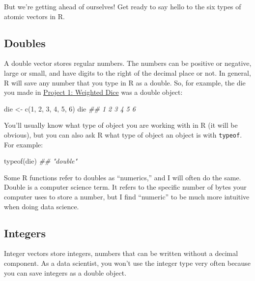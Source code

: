 \documentclass[
  letterpaper,
  DIV=11,
  numbers=noendperiod]{scrbook}
\newenvironment{Shaded}{\begin{snugshade}}{\end{snugshade}}
\newcommand{\DecValTok}[1]{\textcolor[rgb]{0.68,0.00,0.00}{#1}}
\newcommand{\DocumentationTok}[1]{\textcolor[rgb]{0.37,0.37,0.37}{\textit{#1}}}
\newcommand{\FunctionTok}[1]{\textcolor[rgb]{0.28,0.35,0.67}{#1}}
\newcommand{\NormalTok}[1]{\textcolor[rgb]{0.00,0.23,0.31}{#1}}
\newcommand{\OtherTok}[1]{\textcolor[rgb]{0.00,0.23,0.31}{#1}}
\begin{document}
But we're getting ahead of ourselves! Get ready to say hello to the six
types of atomic vectors in R.

\subsection{Doubles}\label{doubles}

A double vector stores regular numbers. The numbers can be positive or
negative, large or small, and have digits to the right of the decimal
place or not. In general, R will save any number that you type in R as a
double. So, for example, the die you made in
\hyperref[sec-project-dice]{Project 1: Weighted Dice} was a double
object:

\begin{Shaded}
\begin{Highlighting}[]
\NormalTok{die }\OtherTok{\textless{}{-}} \FunctionTok{c}\NormalTok{(}\DecValTok{1}\NormalTok{, }\DecValTok{2}\NormalTok{, }\DecValTok{3}\NormalTok{, }\DecValTok{4}\NormalTok{, }\DecValTok{5}\NormalTok{, }\DecValTok{6}\NormalTok{)}
\NormalTok{die}
\DocumentationTok{\#\# 1 2 3 4 5 6}
\end{Highlighting}
\end{Shaded}

You'll usually know what type of object you are working with in R (it
will be obvious), but you can also ask R what type of object an object
is with \texttt{typeof}. For example:

\begin{Shaded}
\begin{Highlighting}[]
\FunctionTok{typeof}\NormalTok{(die)}
\DocumentationTok{\#\#  "double"}
\end{Highlighting}
\end{Shaded}

Some R functions refer to doubles as ``numerics,'' and I will often do
the same. Double is a computer science term. It refers to the specific
number of bytes your computer uses to store a number, but I find
``numeric'' to be much more intuitive when doing data science.

\subsection{Integers}\label{integers}

Integer vectors store integers, numbers that can be written without a
decimal component. As a data scientist, you won't use the integer type
very often because you can save integers as a double object.
\end{document}
